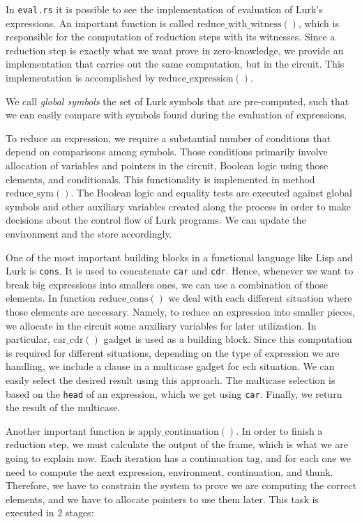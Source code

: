 \documentclass[10pt, english]{article}
\newcommand{\redexp}{\mathrm{reduce\_expression}}
\newcommand{\redwithwit}{\mathrm{reduce\_with\_witness}}
\newcommand{\redcons}{\mathrm{reduce\_cons}}
\newcommand{\redsym}{\mathrm{reduce\_sym}}
\newcommand{\applycont}{\mathrm{apply\_continuation}}
\newcommand{\carcdr}{\mathrm{car\_cdr}}
\newcommand{\makethunk}{\mathrm{make\_thunk}}
\begin{document}
In \verb|eval.rs| it is possible to see the implementation of evaluation of Lurk's expressions. An important function is called $\redwithwit()$, which is responsible for the computation of reduction steps with its witnesses. Since a reduction step is exactly what we want prove in zero-knowledge, we provide an implementation that carries out the same computation, but in the circuit. This implementation is accomplished by $\redexp()$. 

We call \textit{global symbols} the set of Lurk symbols that are pre-computed, such that we can easily compare with symbols found during the evaluation of expressions.

To reduce an expression, we require a substantial number of conditions that depend on comparisons among symbols. Those conditions primarily involve allocation of variables and pointers in the circuit, Boolean logic using those elements, and conditionals. This functionality is implemented in method $\redsym()$. The Boolean logic and equality tests are executed against global symbols and other auxiliary variables created along the process in order to make decisions about the control flow of Lurk programs. We can update the environment and the store accordingly.

One of the most important building blocks in a functional language like Lisp and Lurk is \verb|cons|. It is used to concatenate \verb|car| and \verb|cdr|. Hence, whenever we want to break big expressions into smallers ones, we can use a combination of those elements. In function $\redcons()$ we deal with each different situation where those elements are necessary. Namely, to reduce an expression into smaller pieces, we allocate in the circuit some auxiliary variables for later utilization. In particular, $\carcdr()$ gadget is used as a building block. Since this computation is required for different situations, depending on the type of expression we are handling, we include a clause in a multicase gadget for ech situation. We can easily select the desired result using this approach. The multicase selection is based on the \verb|head| of an expression, which we get using \verb|car|. Finally, we return the result of the multicase.



Another important function is $\applycont()$. In order to finish a reduction step, we must calculate the output of the frame, which is what we are going to explain now. Each iteration has a continuation tag, and for each one we need to compute the next expression, environment, continuation, and thunk. Therefore, we have to constrain the system to prove we are computing the correct elements, and we have to allocate pointers to use them later. This task is executed in 2 stages:
\end{document}
